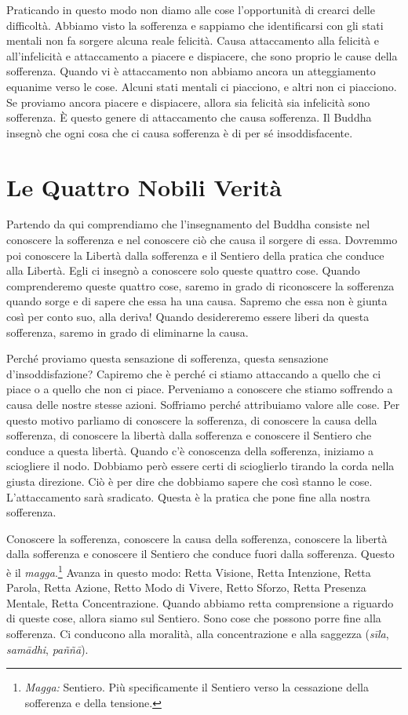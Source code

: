 Praticando in questo modo non diamo alle cose l'opportunità di crearci
delle difficoltà. Abbiamo visto la sofferenza e sappiamo che
identificarsi con gli stati mentali non fa sorgere alcuna reale
felicità. Causa attaccamento alla felicità e all'infelicità e
attaccamento a piacere e dispiacere, che sono proprio le cause della
sofferenza. Quando vi è attaccamento non abbiamo ancora un atteggiamento
equanime verso le cose. Alcuni stati mentali ci piacciono, e altri non
ci piacciono. Se proviamo ancora piacere e dispiacere, allora sia
felicità sia infelicità sono sofferenza. È questo genere di attaccamento
che causa sofferenza. Il Buddha insegnò che ogni cosa che ci causa
sofferenza è di per sé insoddisfacente.

\section{Le Quattro Nobili Verità}

Partendo da qui comprendiamo che l'insegnamento del Buddha consiste nel
conoscere la sofferenza e nel conoscere ciò che causa il sorgere di
essa. Dovremmo poi conoscere la Libertà dalla sofferenza e il Sentiero
della pratica che conduce alla Libertà. Egli ci insegnò a conoscere solo
queste quattro cose. Quando comprenderemo queste quattro cose, saremo in
grado di riconoscere la sofferenza quando sorge e di sapere che essa ha
una causa. Sapremo che essa non è giunta così per conto suo, alla
deriva! Quando desidereremo essere liberi da questa sofferenza, saremo
in grado di eliminarne la causa.

Perché proviamo questa sensazione di sofferenza, questa sensazione
d'insoddisfazione? Capiremo che è perché ci stiamo attaccando a quello
che ci piace o a quello che non ci piace. Perveniamo a conoscere che
stiamo soffrendo a causa delle nostre stesse azioni. Soffriamo perché
attribuiamo valore alle cose. Per questo motivo parliamo di conoscere la
sofferenza, di conoscere la causa della sofferenza, di conoscere la
libertà dalla sofferenza e conoscere il Sentiero che conduce a questa
libertà. Quando c'è conoscenza della sofferenza, iniziamo a sciogliere
il nodo. Dobbiamo però essere certi di scioglierlo tirando la corda
nella giusta direzione. Ciò è per dire che dobbiamo sapere che così
stanno le cose. L'attaccamento sarà sradicato. Questa è la pratica che
pone fine alla nostra sofferenza.

Conoscere la sofferenza, conoscere la causa della sofferenza, conoscere
la libertà dalla sofferenza e conoscere il Sentiero che conduce fuori
dalla sofferenza. Questo è il \emph{magga}.\footnote{\emph{Magga:}
  Sentiero. Più specificamente il Sentiero verso la cessazione della
  sofferenza e della tensione.} Avanza in questo modo: Retta Visione,
Retta Intenzione, Retta Parola, Retta Azione, Retto Modo di Vivere,
Retto Sforzo, Retta Presenza Mentale, Retta Concentrazione. Quando
abbiamo retta comprensione a riguardo di queste cose, allora siamo sul
Sentiero. Sono cose che possono porre fine alla sofferenza. Ci conducono
alla moralità, alla concentrazione e alla saggezza (\emph{sīla},
\emph{samādhi}, \emph{paññā}).

